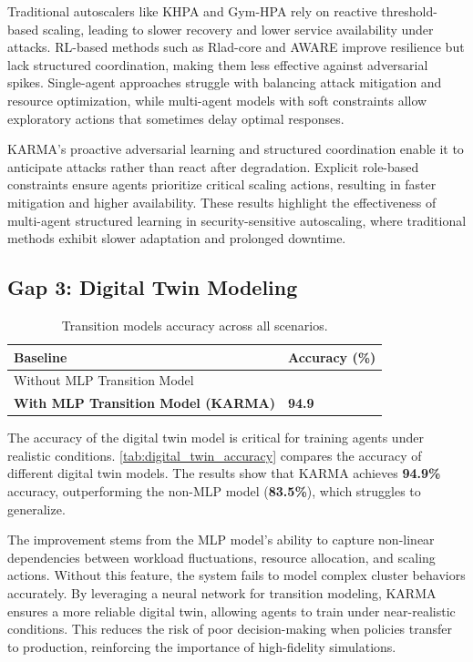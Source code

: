 \documentclass[conference]{IEEEtran}
\begin{document}
Traditional autoscalers like KHPA and Gym-HPA rely on reactive threshold-based scaling, leading to slower recovery and lower service availability under attacks. RL-based methods such as Rlad-core and AWARE improve resilience but lack structured coordination, making them less effective against adversarial spikes. Single-agent approaches struggle with balancing attack mitigation and resource optimization, while multi-agent models with soft constraints allow exploratory actions that sometimes delay optimal responses.

KARMA's proactive adversarial learning and structured coordination enable it to anticipate attacks rather than react after degradation. Explicit role-based constraints ensure agents prioritize critical scaling actions, resulting in faster mitigation and higher availability. These results highlight the effectiveness of multi-agent structured learning in security-sensitive autoscaling, where traditional methods exhibit slower adaptation and prolonged downtime.


\subsection{Gap 3: Digital Twin Modeling}

\begin{table}[h]
    \centering
    \caption{Transition models accuracy across all scenarios.}
    \label{tab:digital_twin_accuracy}{
        \footnotesize
        \begin{tabular}{>{\raggedright\arraybackslash}m{6cm}>{\centering\arraybackslash}m{2cm}}
            \hline
            \textbf{Baseline}                          & \textbf{Accuracy (\%)} \\
            \hline
            Without MLP Transition Model               & 83.5                   \\
            \textbf{With MLP Transition Model (KARMA)} & \textbf{94.9}          \\
            \hline
        \end{tabular}}
\end{table}
%
The accuracy of the digital twin model is critical for training agents under realistic conditions.
\autoref{tab:digital_twin_accuracy} compares the accuracy of different digital twin models. The results show that KARMA achieves \textbf{94.9\%} accuracy, outperforming the non-MLP model (\textbf{83.5\%}), which struggles to generalize.

The improvement stems from the MLP model's ability to capture non-linear dependencies between workload fluctuations, resource allocation, and scaling actions. Without this feature, the system fails to model complex cluster behaviors accurately.
%
By leveraging a neural network for transition modeling, KARMA ensures a more reliable digital twin, allowing agents to train under near-realistic conditions. This reduces the risk of poor decision-making when policies transfer to production, reinforcing the importance of high-fidelity simulations.
\end{document}
